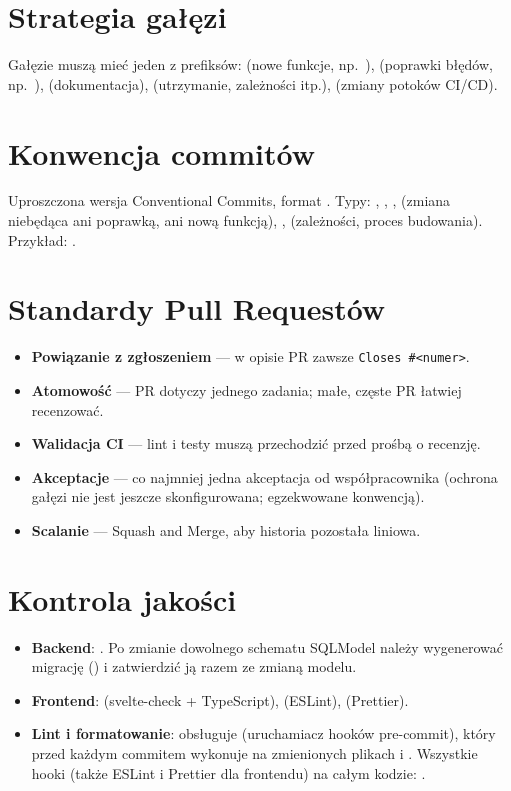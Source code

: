\section{Strategia gałęzi}

Gałęzie muszą mieć jeden z prefiksów:  (nowe funkcje, np.\ ),
 (poprawki błędów, np.\ ),  (dokumentacja),
 (utrzymanie, zależności itp.),  (zmiany potoków CI/CD).

\section{Konwencja commitów}

Uproszczona wersja Conventional Commits, format .
Typy: , , ,  (zmiana niebędąca ani
poprawką, ani nową funkcją), ,  (zależności, proces budowania).
Przykład: .

\section{Standardy Pull Requestów}

\begin{itemize}
  \item \textbf{Powiązanie z zgłoszeniem} --- w opisie PR zawsze \texttt{Closes \#<numer>}.
  \item \textbf{Atomowość} --- PR dotyczy jednego zadania; małe, częste PR łatwiej recenzować.
  \item \textbf{Walidacja CI} --- lint i testy muszą przechodzić przed prośbą o recenzję.
  \item \textbf{Akceptacje} --- co najmniej jedna akceptacja od współpracownika (ochrona gałęzi nie jest jeszcze skonfigurowana; egzekwowane konwencją).
  \item \textbf{Scalanie} --- Squash and Merge, aby historia  pozostała liniowa.
\end{itemize}

\section{Kontrola jakości}

\begin{itemize}
  \item \textbf{Backend}: . Po zmianie dowolnego schematu SQLModel należy wygenerować migrację () i zatwierdzić ją razem ze zmianą modelu.
  \item \textbf{Frontend}:  (svelte-check + TypeScript),  (ESLint),  (Prettier).
  \item \textbf{Lint i formatowanie}: obsługuje  (uruchamiacz hooków pre-commit), który przed każdym commitem wykonuje na zmienionych plikach  i . Wszystkie hooki (także ESLint i Prettier dla frontendu) na całym kodzie: .
\end{itemize}

